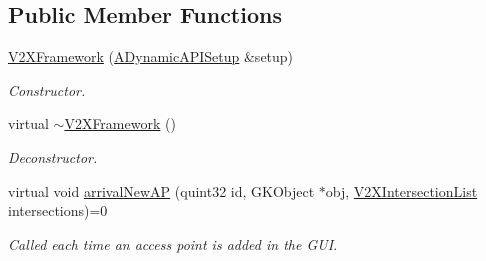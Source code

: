 \subsection*{Public Member Functions}
\begin{DoxyCompactItemize}
\item 
\hyperlink{classV2XFramework_a7a828eef39f000cd7611e73d7a04b051}{V2\+X\+Framework} (\hyperlink{classADynamicAPISetup}{A\+Dynamic\+A\+P\+I\+Setup} \&setup)
\begin{DoxyCompactList}\small\item\em Constructor. \end{DoxyCompactList}\item 
virtual \hyperlink{classV2XFramework_a4dda2e4d2904f3aa79c91d9ee1c124b2}{$\sim$\+V2\+X\+Framework} ()\hypertarget{classV2XFramework_a4dda2e4d2904f3aa79c91d9ee1c124b2}{}\label{classV2XFramework_a4dda2e4d2904f3aa79c91d9ee1c124b2}

\begin{DoxyCompactList}\small\item\em Deconstructor. \end{DoxyCompactList}\item 
virtual void \hyperlink{classV2XFramework_a192e2e3d6ddcf126cdeff7fbc016589e}{arrival\+New\+AP} (quint32 id, G\+K\+Object $\ast$obj, \hyperlink{group__V2XFramework_ga22a1c07fac7df77efff8f0d4f6f3c248}{V2\+X\+Intersection\+List} intersections)=0
\begin{DoxyCompactList}\small\item\em Called each time an access point is added in the G\+UI. \end{DoxyCompactList}\end{DoxyCompactItemize}
